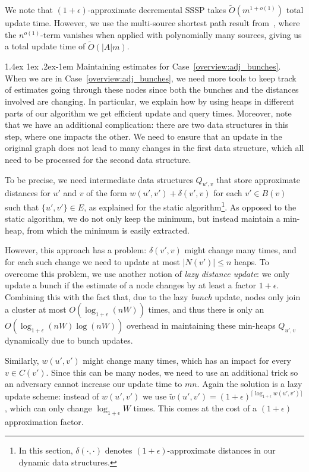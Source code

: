 \documentclass[11pt]{article}
\makeatletter
\theoremstyle{definition}
\theoremstyle{remark}
\renewcommand{\paragraph}{%
  \@startsection{paragraph}{4}%
  {\z@}{1.4ex \@plus 1ex \@minus .2ex}{-1em}%
  {\normalfont\normalsize\bfseries}%
}
\makeatother
\begin{document}
We note that $(1+\epsilon)$-approximate decremental SSSP takes $\tilde O(m^{1+o(1)})$ total update time. However, we use the multi-source shortest path result from~\cite{LN2020}, where the $n^{o(1)}$-term vanishes when applied with polynomially many sources, giving us a total update time of $\tilde O(|A|m)$.
 

\paragraph{Maintaining estimates for Case~\ref{overview:adj_bunches}.}
When we are in Case~\ref{overview:adj_bunches}, we need more tools to keep track of estimates going through these nodes since both the bunches and the distances involved are changing. In particular, we explain how by using heaps in different parts of our algorithm we get efficient update and query times.
Moreover, note that we have an additional complication: there are two data structures in this step, where one impacts the other. We need to ensure that an update in the original graph does not lead to many changes in the first data structure, which all need to be processed for the second data structure. 

To be precise, we need intermediate data structures $Q_{u',v}$ that store approximate distances for $u'$ and $v$ of the form $w(u',v')+\delta(v',v)$ for each $v'\in B(v)$ such that $\{u',v'\}\in E$, as explained for the static algorithm\footnote{In this section, $\delta(\cdot,\cdot)$ denotes $(1+\epsilon)$-approximate distances in our dynamic data structures.}. As opposed to the static algorithm, we do not only keep the minimum, but instead maintain a min-heap, from which the minimum is easily extracted. 

However, this approach has a problem: $\delta(v',v)$ might change many times, and for each such change we need to update at most $|N(v')|\leq n$ heaps. To overcome this problem, we use another notion of \textit{lazy distance update}: we only update a bunch if the estimate of a node changes by at least a factor $1+\epsilon$. Combining this with the fact that, due to the lazy \textit{bunch} update, nodes only join a cluster at most $O(\log_{1+\epsilon}(nW))$ times, and thus there is only an $ O(\log_{1+\epsilon}(nW)\log(nW))$ overhead in maintaining these min-heaps $Q_{u',v}$ dynamically due to bunch updates. 

Similarly, $w(u',v')$ might change many times, which has an impact for every $v\in C(v')$. Since this can be many nodes, we need to use an additional trick so an adversary cannot increase our update time to $mn$. Again the solution is a lazy update scheme: instead of $w(u',v')$ we use $\tilde w(u', v')=(1+\epsilon)^{\lceil \log_{1+\epsilon} w(u',v')\rceil}$, which can only change $\log_{1+\epsilon} W$ times. This comes at the cost of a $(1+\epsilon)$ approximation factor. 
\end{document}
